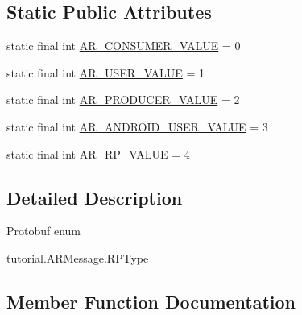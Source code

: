 \subsection*{Static Public Attributes}
\begin{DoxyCompactItemize}
\item 
static final int \hyperlink{enumcom_1_1rutgers_1_1Core_1_1Message_1_1ARMessage_1_1RPType_a5e325f85776cd1e520022a17f2575d9b}{A\+R\+\_\+\+C\+O\+N\+S\+U\+M\+E\+R\+\_\+\+V\+A\+L\+UE} = 0
\item 
static final int \hyperlink{enumcom_1_1rutgers_1_1Core_1_1Message_1_1ARMessage_1_1RPType_ac31f1c8361a0e3aa71aa8998ffb3d6c6}{A\+R\+\_\+\+U\+S\+E\+R\+\_\+\+V\+A\+L\+UE} = 1
\item 
static final int \hyperlink{enumcom_1_1rutgers_1_1Core_1_1Message_1_1ARMessage_1_1RPType_a1891edf325d2082fb7ac20ebae129799}{A\+R\+\_\+\+P\+R\+O\+D\+U\+C\+E\+R\+\_\+\+V\+A\+L\+UE} = 2
\item 
static final int \hyperlink{enumcom_1_1rutgers_1_1Core_1_1Message_1_1ARMessage_1_1RPType_a5c052f22477d93eaa862bab3ef7a5439}{A\+R\+\_\+\+A\+N\+D\+R\+O\+I\+D\+\_\+\+U\+S\+E\+R\+\_\+\+V\+A\+L\+UE} = 3
\item 
static final int \hyperlink{enumcom_1_1rutgers_1_1Core_1_1Message_1_1ARMessage_1_1RPType_a9e87aa0892b042fd4ba97de39501e9e1}{A\+R\+\_\+\+R\+P\+\_\+\+V\+A\+L\+UE} = 4
\end{DoxyCompactItemize}


\subsection{Detailed Description}
Protobuf enum
\begin{DoxyCode}
tutorial.ARMessage.RPType 
\end{DoxyCode}
 

\subsection{Member Function Documentation}
\mbox{\label{enumcom_1_1rutgers_1_1Core_1_1Message_1_1ARMessage_1_1RPType_aa300501b5400695678c229e3d7f6eff3}} 
